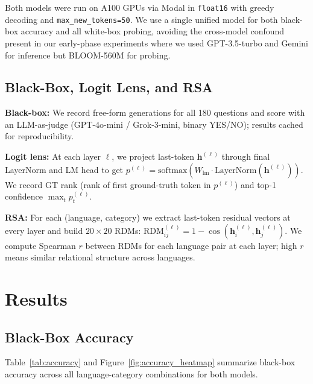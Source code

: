 \documentclass[10pt]{article}
\begin{document}
Both models were run on A100 GPUs via Modal in \texttt{float16} with greedy decoding
and \texttt{max\_new\_tokens=50}. We use a single unified model for both black-box
accuracy and all white-box probing, avoiding the cross-model confound present in
our early-phase experiments where we used GPT-3.5-turbo and Gemini for inference but
BLOOM-560M for probing.

\subsection{Black-Box, Logit Lens, and RSA}
\label{sec:blackbox}

\textbf{Black-box:} We record free-form generations for all 180 questions and score with an LLM-as-judge (GPT-4o-mini / Grok-3-mini, binary YES/NO); results cached for reproducibility.

\textbf{Logit lens:} At each layer $\ell$, we project last-token $\mathbf{h}^{(\ell)}$ through final LayerNorm and LM head to get $p^{(\ell)} = \text{softmax}(W_{\text{lm}} \cdot \text{LayerNorm}(\mathbf{h}^{(\ell)}))$. We record GT rank (rank of first ground-truth token in $p^{(\ell)}$) and top-1 confidence $\max_t p^{(\ell)}_t$.

\textbf{RSA:} For each (language, category) we extract last-token residual vectors at every layer and build $20{\times}20$ RDMs: $\text{RDM}^{(\ell)}_{ij} = 1 - \cos(\mathbf{h}^{(\ell)}_i, \mathbf{h}^{(\ell)}_j)$. We compute Spearman $r$ between RDMs for each language pair at each layer; high $r$ means similar relational structure across languages.

\section{Results}

\subsection{Black-Box Accuracy}
\label{sec:results_accuracy}

Table~\ref{tab:accuracy} and Figure~\ref{fig:accuracy_heatmap} summarize black-box
accuracy across all language-category combinations for both models.
\end{document}
